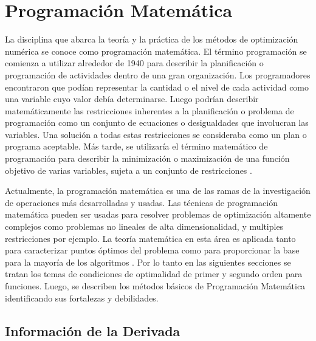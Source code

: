 
\chapter{Programación Matemática} %

\label{Chapter3} %
La disciplina que abarca la teoría y la práctica de los métodos de optimización numérica se conoce como programación matemática\cite{antoniou_practical_2007}. El término programación se comienza a utilizar alrededor de 1940 para describir la planificación o programación de actividades dentro de una gran organización. Los programadores encontraron que podían representar la cantidad o el nivel de cada actividad como una variable cuyo valor debía determinarse. Luego podrían describir matemáticamente las restricciones inherentes a la planificación o problema de programación como un conjunto de ecuaciones o desigualdades que involucran las variables. Una solución a todas estas restricciones se consideraba como un plan o programa aceptable. Más tarde, se utilizaría el término matemático
de programación para describir la minimización o maximización de una
función objetivo de varias variables, sujeta a un conjunto de restricciones \cite{takriti1994ampl}. 

Actualmente, la programación matemática es una de las ramas de la investigación de operaciones más desarrolladas y usadas. Las técnicas de programación matemática pueden ser usadas para resolver  problemas de optimización altamente complejos como problemas no lineales de alta dimensionalidad, y multiples restricciones por ejemplo. La teoría matemática en esta área es aplicada tanto para caracterizar puntos óptimos del problema como para proporcionar la base para la mayoría de los algoritmos \cite{nocedal2006numerical}. Por lo tanto en las siguientes secciones se tratan los temas de condiciones de optimalidad de primer y segundo orden para funciones. Luego, se describen los métodos básicos de Programación Matemática identificando sus fortalezas y debilidades.

\section{Información de la Derivada}

